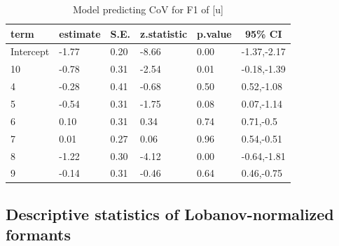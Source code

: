 \documentclass[
]{article}
\begin{document}
\begin{table}[tbp]

\begin{center}
\begin{threeparttable}

\caption{\label{tab:f1-u-model}Model predicting CoV for F1 of [u]}

\begin{tabular}{llllll}
\toprule
term & \multicolumn{1}{c}{estimate} & \multicolumn{1}{c}{S.E.} & \multicolumn{1}{c}{z.statistic} & \multicolumn{1}{c}{p.value} & \multicolumn{1}{c}{95\% CI}\\
\midrule
Intercept & -1.77 & 0.20 & -8.66 & 0.00 & -1.37,-2.17\\
10 & -0.78 & 0.31 & -2.54 & 0.01 & -0.18,-1.39\\
4 & -0.28 & 0.41 & -0.68 & 0.50 & 0.52,-1.08\\
5 & -0.54 & 0.31 & -1.75 & 0.08 & 0.07,-1.14\\
6 & 0.10 & 0.31 & 0.34 & 0.74 & 0.71,-0.5\\
7 & 0.01 & 0.27 & 0.06 & 0.96 & 0.54,-0.51\\
8 & -1.22 & 0.30 & -4.12 & 0.00 & -0.64,-1.81\\
9 & -0.14 & 0.31 & -0.46 & 0.64 & 0.46,-0.75\\
\bottomrule
\end{tabular}

\end{threeparttable}
\end{center}

\end{table}

\hypertarget{descriptive-statistics-of-lobanov-normalized-formants}{%
\subsection{Descriptive statistics of Lobanov-normalized formants}\label{descriptive-statistics-of-lobanov-normalized-formants}}
\end{document}
